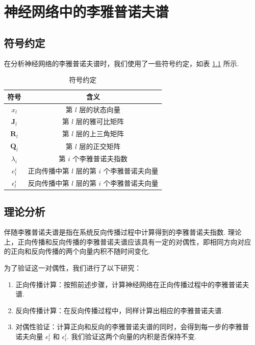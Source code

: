 
\chapter{神经网络中的李雅普诺夫谱}

\section{符号约定}

在分析神经网络的李雅普诺夫谱时，我们使用了一些符号约定，如表 \ref{tab:symbols} 所示.

\begin{table}[htbp]
  \centering
  \caption{符号约定}
  \label{tab:symbols}
  \begin{tabular}{cc}
     \toprule
     符号 & 含义 \\
     \midrule
     \(x_l\) & 第 \(l\) 层的状态向量 \\
     \(\mathbf{J}_l\) & 第 \(l\) 层的雅可比矩阵 \\
     \(\mathbf{R}_l\) & 第 \(l\) 层的上三角矩阵 \\
     \(\mathbf{Q}_l\) & 第 \(l\) 层的正交矩阵 \\
     \(\lambda_i\) & 第 \(i\) 个李雅普诺夫指数 \\
     \(e_{l}^{i}\) & 正向传播中第 \(l\) 层的第 \(i\) 个李雅普诺夫向量 \\
     \(\epsilon_{l}^{i}\) & 反向传播中第 \(l\) 层的第 \(i\) 个李雅普诺夫向量 \\
     \bottomrule
  \end{tabular}
\end{table}

\section{理论分析}

伴随李雅普诺夫谱是指在系统反向传播过程中计算得到的李雅普诺夫指数. 理论上，正向传播和反向传播的李雅普诺夫谱应该具有一定的对偶性，即相同方向对应的正向和反向传播的两个向量内积不随时间变化.

为了验证这一对偶性，我们进行了以下研究：

\begin{enumerate}
  \item 正向传播计算：按照前述步骤，计算神经网络在正向传播过程中的李雅普诺夫谱. 
  \item 反向传播计算：在反向传播过程中，同样计算出相应的李雅普诺夫谱. 
  \item 对偶性验证：计算正向和反向的李雅普诺夫谱的同时，会得到每一步的李雅普诺夫向量 \(e_{l}^{i}\) 和 \(\epsilon_{l}^{i}\). 我们验证这两个向量的内积是否保持不变.
\end{enumerate}


